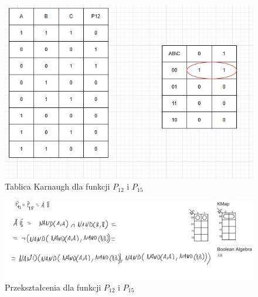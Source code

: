 \documentclass[11pt]{article}
\begin{document}
\begin{figure}[H]
\centering
\includegraphics[width=.9\linewidth]{../../CW0POPRW/P12.JPG}
\caption{Tablica Karnaugh dla funkcji \(P_{12}\) i \(P_{15}\)}
\end{figure}
\begin{figure}[htbp]
\centering
\includegraphics[width=.9\linewidth]{p12p15.jpg}
\caption{Przekształcenia dla funkcji \(P_{12}\) i \(P_{15}\)}
\end{figure}
\end{document}
